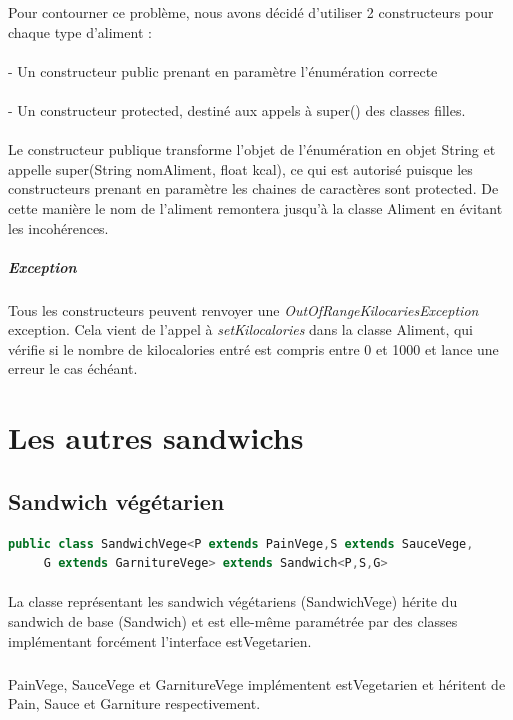 \documentclass[a4paper]{article}
\begin{document}
Pour contourner ce problème, nous avons décidé d'utiliser 2 constructeurs pour chaque type d'aliment : 

\paragraph{}
- Un constructeur public prenant en paramètre l'énumération correcte
\paragraph{}
- Un constructeur protected, destiné aux appels à super() des classes filles.

\paragraph{}
Le constructeur publique transforme l'objet de l'énumération en objet String et appelle super(String nomAliment, float kcal), ce qui est autorisé puisque les constructeurs prenant
en paramètre les chaines de caractères sont protected.
De cette manière le nom de l'aliment remontera jusqu'à la classe Aliment en évitant les incohérences.

\subparagraph{Exception}
Tous les constructeurs peuvent renvoyer une \emph{OutOfRangeKilocariesException} exception. Cela vient de l'appel à \emph{setKilocalories} dans la classe Aliment, qui vérifie si le nombre de kilocalories entré est
compris entre 0 et 1000 et lance une erreur le cas échéant.

\clearpage
\section{Les autres sandwichs}

\subsection{Sandwich végétarien}
\begin{lstlisting}[language=Java, caption=Entête de la classe SandwichVege]
    public class SandwichVege<P extends PainVege,S extends SauceVege,
     G extends GarnitureVege> extends Sandwich<P,S,G>
\end{lstlisting}
\paragraph{}
La classe représentant les sandwich végétariens (SandwichVege) hérite du sandwich de base (Sandwich) et est elle-même paramétrée par des classes implémentant forcément l'interface estVegetarien.
\subparagraph{}
PainVege, SauceVege et GarnitureVege implémentent estVegetarien et héritent de Pain, Sauce et Garniture respectivement.
\end{document}
